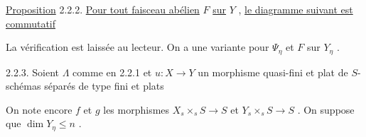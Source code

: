 \underline{Proposition} 2.2.2. \underline{Pour tout faisceau abélien} $F$ \underline{sur} $Y$ , \underline{le diagramme suivant est commutatif}

\begin{center}
\end{center}


La vérification est laissée au lecteur. On a une variante pour $\Psi_\eta$ et $F$ sur $Y_\eta$ .

2.2.3. Soient $\Lambda$ comme en 2.2.1 et $u : X \to Y$ un morphisme quasi-fini et plat de $S$-schémas séparés de type fini et plats

\begin{center}
\end{center}
On note encore $f$ et $g$ les morphismes $X_s \times_s S \to S$ et $Y_s \times_s S \to S$ . On suppose que $\dim Y_\eta \leq n$ .

